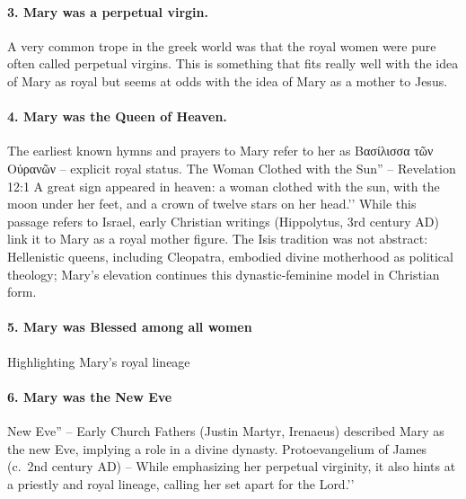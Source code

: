 \paragraph{3.
Mary was a perpetual virgin.}\label{par:mary-was-a-perpetual-virgin.}
A very common trope in the greek world was that the royal women were pure often called perpetual virgins.
This is something that fits really well with the idea of Mary as royal but seems at odds with the idea of Mary as a mother to Jesus.
\paragraph{4.
Mary was the Queen of Heaven.}\label{par:mary-was-the-queen-of-heaven.}
The earliest known hymns and prayers to Mary refer to her as Βασίλισσα τῶν Οὐρανῶν – explicit royal status.
The Woman Clothed with the Sun'' -- Revelation 12:1 A great sign appeared in heaven: a woman clothed with the sun, with the moon under her feet, and a crown of twelve stars on her head.’’ While this passage refers to Israel, early Christian writings (Hippolytus, 3rd century AD) link it to Mary as a royal mother figure. The Isis tradition was not abstract: Hellenistic queens, including Cleopatra, embodied divine motherhood as political theology; Mary’s elevation continues this dynastic-feminine model in Christian form.
\paragraph{5.
Mary was Blessed among all women}\label{par:mary-was-blessed-among-all-women}
Highlighting Mary’s royal lineage
\paragraph{6.
Mary was the New Eve}\label{par:mary-was-the-new-eve}
New Eve'' -- Early Church Fathers (Justin Martyr, Irenaeus) described Mary as the new Eve, implying a role in a divine dynasty. Protoevangelium of James (c.~2nd century AD) -- While emphasizing her perpetual virginity, it also hints at a priestly and royal lineage, calling her set apart for the Lord.’’
